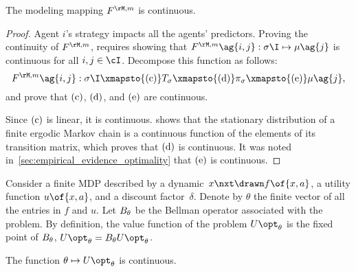 \begin{proposition}
\label{res:modeling_continuity}
The modeling mapping \(\FM\) is continuous.
\end{proposition}

\begin{proof}
Agent \(i\)'s strategy impacts all the agents' predictors.
Proving the continuity of \(\FM\), requires showing that \(\FM\ag{i, j}: \sigma\I \mapsto \mu\ag{j}\) is continuous for all \(i, j \in \cI\).
Decompose this function as follows:
\[\FM\ag{i, j}: \sigma\I \xmapsto{\subfunc{c}} T\strat{\sigma} \xmapsto{\subfunc{d}} \pi\strat{\sigma} \xmapsto{\subfunc{e}} \mu\ag{j},
\]
and prove that \(\mathrm{(c)}\), \(\mathrm{(d)}\), and \(\mathrm{(e)}\) are continuous.

Since \(\mathrm{(c)}\) is linear, it is continuous.
\cite[Theorem~4.1]{meyer:1980} shows that the stationary distribution of a finite ergodic Markov chain is a continuous function of the elements of its transition matrix, which proves that \(\mathrm{(d)}\) is continuous.
It was noted in~\cref{sec:empirical_evidence_optimality} that \(\mathrm{(e)}\) is continuous.
\end{proof}

\begin{lemma}
\label{res:markov_continuity}
Consider a finite MDP described by a dynamic~\(x\nxt \drawn f \of{x, a}\), a utility function \(u \of{x, a}\), and a discount factor~\(\delta\).
Denote by \(\theta\) the finite vector of all the entries in \(f\) and \(u\).
Let \(B_{\theta}\) be the Bellman operator associated with the problem.
By definition, the value function of the problem \(\Utheta\) is the fixed point of \(B_{\theta}\), \(\Utheta = \Btheta \Utheta\).

The function \(\theta \mapsto \Utheta\) is continuous.
\end{lemma}

